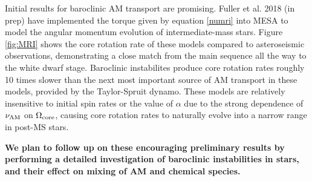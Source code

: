 Initial results for baroclinic AM transport are promising. Fuller et al. 2018 (in prep) have implemented the torque given by equation \ref{numri} into MESA to model the angular momentum evolution of intermediate-mass stars. Figure \ref{fig:MRI} shows the core rotation rate of these models compared to asteroseismic observations, demonstrating a close match from the main sequence all the way to the white dwarf stage. Baroclinic instabilites produce core rotation rates roughly 10 times slower than the next most important source of AM transport in these models, provided by the Taylor-Spruit dynamo. These models are relatively insensitive to initial spin rates or the value of $\alpha$ due to the strong dependence of $\nu_{\rm AM}$ on $\Omega_{\rm core}$, causing core rotation rates to naturally evolve into a narrow range in post-MS stars.

{\bf We plan to follow up on these encouraging preliminary results by performing a detailed investigation of baroclinic instabilities in stars, and their effect on mixing of AM and chemical species.}